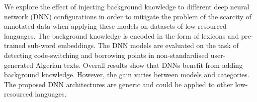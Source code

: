 We explore the effect of injecting background knowledge to different deep neural network (DNN) configurations in order to mitigate the problem of the scarcity of annotated data when applying these models on datasets of low-resourced languages. The background knowledge is encoded in the form of lexicons and pre-trained sub-word embeddings.  The DNN models are evaluated on the task of detecting code-switching and borrowing points in non-standardised user-generated Algerian texts. Overall results show that DNNs benefit from adding background knowledge. However, the gain varies between models and categories. The proposed DNN architectures are generic and could be applied to other low-resourced languages.
